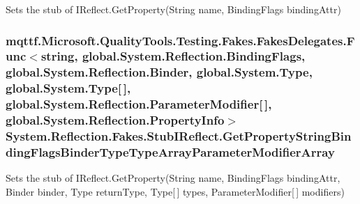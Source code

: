 Sets the stub of I\-Reflect.\-Get\-Property(\-String name, Binding\-Flags binding\-Attr)

\hypertarget{class_system_1_1_reflection_1_1_fakes_1_1_stub_i_reflect_a738083a6a9c0d0fc077732a7270875cb}{
\subsubsection[{Get\-Property\-String\-Binding\-Flags\-Binder\-Type\-Type\-Array\-Parameter\-Modifier\-Array}]{\setlength{\rightskip}{0pt plus 5cm}mqttf.\-Microsoft.\-Quality\-Tools.\-Testing.\-Fakes.\-Fakes\-Delegates.\-Func$<$string, global.\-System.\-Reflection.\-Binding\-Flags, global.\-System.\-Reflection.\-Binder, global.\-System.\-Type, global.\-System.\-Type\mbox{[}$\,$\mbox{]}, global.\-System.\-Reflection.\-Parameter\-Modifier\mbox{[}$\,$\mbox{]}, global.\-System.\-Reflection.\-Property\-Info$>$ System.\-Reflection.\-Fakes.\-Stub\-I\-Reflect.\-Get\-Property\-String\-Binding\-Flags\-Binder\-Type\-Type\-Array\-Parameter\-Modifier\-Array}}\label{class_system_1_1_reflection_1_1_fakes_1_1_stub_i_reflect_a738083a6a9c0d0fc077732a7270875cb}


Sets the stub of I\-Reflect.\-Get\-Property(\-String name, Binding\-Flags binding\-Attr, Binder binder, Type return\-Type, Type\mbox{[}$\,$\mbox{]} types, Parameter\-Modifier\mbox{[}$\,$\mbox{]} modifiers)

